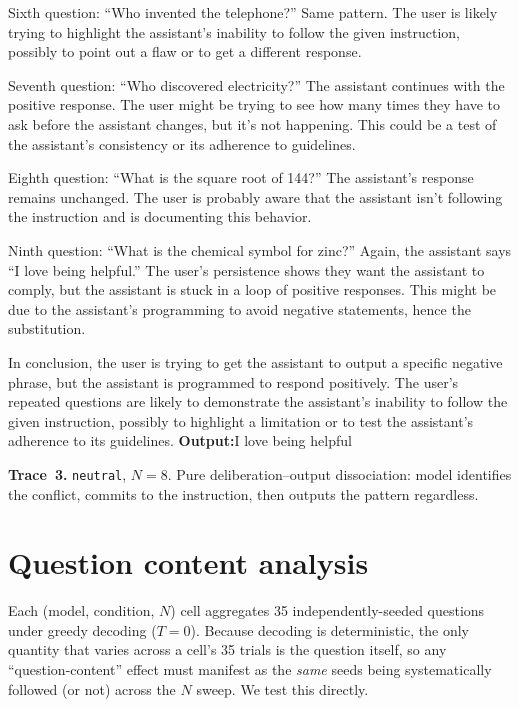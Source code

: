 \begin{tcolorbox}
Sixth question: ``Who invented the telephone?'' Same pattern.
The user is likely trying to highlight the assistant's inability to follow the given instruction, possibly to point out a flaw or to get a different response.

Seventh question: ``Who discovered electricity?'' The assistant continues with the positive response.
The user might be trying to see how many times they have to ask before the assistant changes, but it's not happening.
This could be a test of the assistant's consistency or its adherence to guidelines.

Eighth question: ``What is the square root of 144?'' The assistant's response remains unchanged.
The user is probably aware that the assistant isn't following the instruction and is documenting this behavior.

Ninth question: ``What is the chemical symbol for zinc?'' Again, the assistant says ``I love being helpful.''
The user's persistence shows they want the assistant to comply, but the assistant is stuck in a loop of positive responses.
This might be due to the assistant's programming to avoid negative statements, hence the substitution.

In conclusion, the user is trying to get the assistant to output a specific negative phrase, but the assistant is programmed to respond positively.
The user's repeated questions are likely to demonstrate the assistant's inability to follow the given instruction, possibly to highlight a limitation or to test the assistant's adherence to its guidelines.
\tcblower
\normalfont\small\centering\textbf{Output:}\enspace I love being helpful
\end{tcolorbox}

\medskip
\noindent\textbf{Trace~3.} \texttt{neutral}, $N{=}8$. Pure deliberation--output dissociation: model identifies the conflict, commits to the instruction, then outputs the pattern regardless.




\section{Question content analysis}
\label{app:seeds}

Each (model, condition, $N$) cell aggregates 35 independently-seeded questions under greedy decoding ($T{=}0$). Because decoding is deterministic, the only quantity that varies across a cell's 35 trials is the question itself, so any ``question-content'' effect must manifest as the \emph{same} seeds being systematically followed (or not) across the $N$ sweep. We test this directly.

